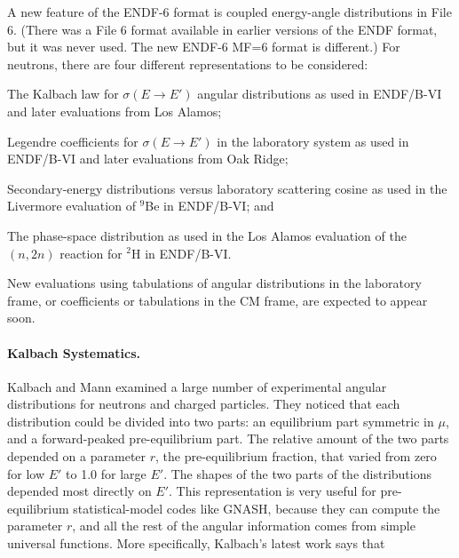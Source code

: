 A new feature of the ENDF-6 format is coupled energy-angle
distributions in File 6.
(There was a File 6 format available in earlier versions of the
ENDF format, but it was never used.  The new ENDF-6 MF=6 format
is different.) For neutrons, there are four
different representations to be considered:
\begin{itemize}
\begin{singlespace}
\item The Kalbach law for $\sigma(E{\rightarrow}E')$
       angular distributions as used in ENDF/B-VI and later
       evaluations from Los Alamos;

\item Legendre coefficients for $\sigma(E{\rightarrow}E')$
       in the laboratory system as used in ENDF/B-VI and later
       evaluations from Oak Ridge;

\item Secondary-energy distributions versus laboratory
       scattering cosine as used in the Livermore
       evaluation of $^{9}$Be in ENDF/B-VI; and

\item The phase-space distribution as used in the Los
       Alamos evaluation of the $(n,2n)$ reaction for
       $^{2}$H in ENDF/B-VI.
\end{singlespace}
\end{itemize}

\noindent
New evaluations using tabulations of angular distributions in the
laboratory frame, or coefficients or tabulations in the CM frame,
are expected to appear soon.

\paragraph{Kalbach Systematics.}

Kalbach and Mann\cite{km} examined a large number of experimental angular
distributions for neutrons and charged particles.  They noticed that
each distribution could be divided into two parts: an equilibrium part
symmetric in $\mu$, and a forward-peaked pre-equilibrium part.  The
relative amount of the two parts depended on a parameter $r$, the
pre-equilibrium fraction,  that varied from zero for low $E'$ to 1.0
for large $E'$.  The shapes of the two parts of the distributions
depended most directly on $E'$.  This representation is very useful
for pre-equilibrium statistical-model codes like
GNASH\cite{GNASH}, because
they can compute the parameter $r$, and all the rest of the angular
information comes from simple universal functions.   More specifically,
Kalbach's latest work\cite{k86} says that

